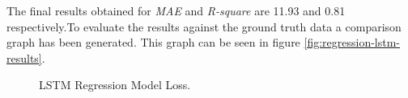 The final results obtained for \textit{MAE} and \textit{R-square} are 11.93 and 0.81 respectively.To evaluate the results against the ground truth data a comparison graph has been generated. This graph can be seen in figure \ref{fig:regression-lstm-results}.

\begin{figure}[H]
\begin{center}
\end{center}
\decoRule
\caption[LSTM Regression Model Loss]{LSTM Regression Model Loss.}
\label{fig:regression-lstm-loss}\end{figure}

